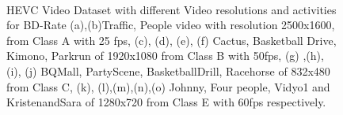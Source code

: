 \documentclass{book}
\begin{document}
\begin{figure}[bt!]
	\\
	\caption{\label{fig:HEVC_Video_Databases}
		HEVC Video Dataset with different Video resolutions and activities for BD-Rate \cite{Kalpana}
		(a),(b)Traffic, People video with resolution 2500x1600, from Class A with 25 fps,
		(c), (d), (e), (f) Cactus, Basketball Drive, Kimono, Parkrun of 1920x1080 from Class B with 50fps,
		(g) ,(h), (i), (j) BQMall, PartyScene, BasketballDrill, Racehorse of 832x480 from Class C, 		
		(k), (l),(m),(n),(o) Johnny, Four people, Vidyo1 and KristenandSara of 1280x720 from Class E with 60fps respectively. 
	}	
\end{figure}
\end{document}
